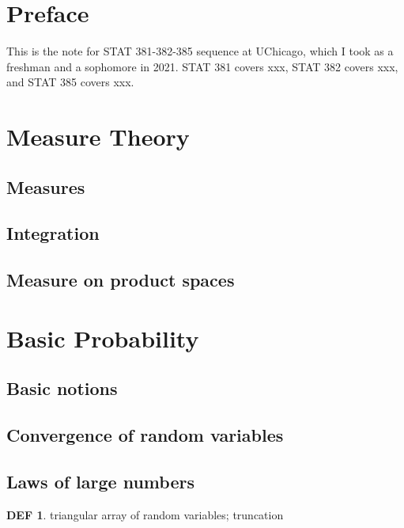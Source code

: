 \documentclass[hidelinks,11pt]{article}
\theoremstyle{definition}
\newtheorem*{defin}{DEF}
\theoremstyle{dotles}
\theoremstyle{dotless}
\theoremstyle{remark}
\begin{document}
\section*{Preface}
This is the note for STAT 381-382-385 sequence at UChicago, which I took as a freshman and a sophomore in 2021. STAT 381 covers xxx, STAT 382 covers xxx, and STAT 385 covers xxx.
\tableofcontents

\section{Measure Theory}

\subsection{Measures}

\subsection{Integration}

\subsection{Measure on product spaces}

\section{Basic Probability}

\subsection{Basic notions}

\subsection{Convergence of random variables}

\bigbreak
\subsection{Laws of large numbers}

\begin{defin}
triangular array of random variables; truncation
\end{defin}
\end{document}
